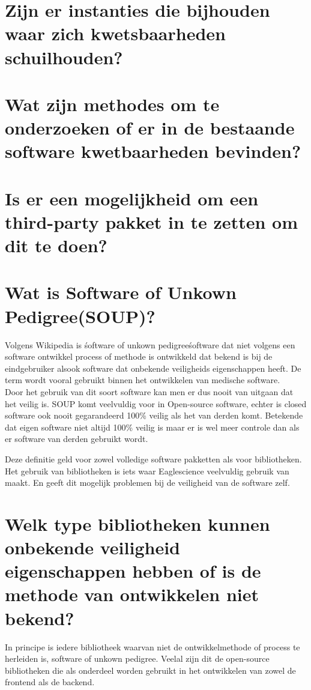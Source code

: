 \section{Zijn er instanties die bijhouden waar zich kwetsbaarheden schuilhouden?}
\section{Wat zijn methodes om te onderzoeken of er in de bestaande software kwetbaarheden bevinden?}
\section{Is er een mogelijkheid om een third-party pakket in te zetten om dit te doen?}




\section{Wat is Software of Unkown Pedigree(SOUP)?}
Volgens Wikipedia is \'software of unkown pedigree\' software dat niet volgens een software ontwikkel process of methode is ontwikkeld dat bekend is bij de eindgebruiker alsook software dat onbekende veiligheids eigenschappen heeft. De term wordt vooral gebruikt binnen het ontwikkelen van medische software.\\  %
Door het gebruik van dit soort software kan men er dus nooit van uitgaan dat het veilig is.  SOUP komt veelvuldig voor in Open-source software, echter is closed software ook nooit gegarandeerd 100\% veilig als het van derden komt. Betekende dat eigen software niet altijd 100\% veilig is maar er is wel meer controle dan als er software van derden gebruikt wordt.

Deze definitie geld voor zowel volledige software pakketten als voor bibliotheken. Het gebruik van bibliotheken is iets waar Eaglescience veelvuldig gebruik van maakt. En geeft dit mogelijk problemen bij de veiligheid van de software zelf.

\section{Welk type bibliotheken kunnen onbekende veiligheid eigenschappen hebben of is de methode van ontwikkelen niet bekend?}
In principe is iedere bibliotheek waarvan niet de ontwikkelmethode of process te herleiden is, software of unkown pedigree. Veelal zijn dit de open-source bibliotheken die als onderdeel worden gebruikt in het ontwikkelen van zowel de frontend als de backend.

